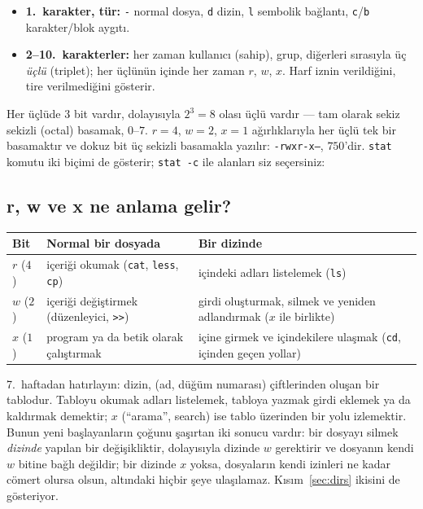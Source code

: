 \documentclass[11pt,a4paper]{article}
\newcommand{\cmd}[1]{\texttt{#1}}
\begin{document}
\begin{itemize}
  \item \textbf{1.\ karakter, tür:} \texttt{-} normal dosya, \texttt{d} dizin, \texttt{l} sembolik bağlantı, \texttt{c}/\texttt{b} karakter/blok aygıtı.
  \item \textbf{2--10.\ karakterler:} her zaman kullanıcı (sahip), grup, diğerleri sırasıyla üç \emph{üçlü} (triplet); her üçlünün içinde her zaman $r$, $w$, $x$. Harf iznin verildiğini, tire verilmediğini gösterir.
\end{itemize}
Her üçlüde $3$ bit vardır, dolayısıyla $2^3 = 8$ olası üçlü vardır --- tam olarak sekiz sekizli (octal) basamak, $0$--$7$. $r = 4$, $w = 2$, $x = 1$ ağırlıklarıyla her üçlü tek bir basamaktır ve dokuz bit üç sekizli basamakla yazılır: \texttt{-rwxr-x---}, $750$'dir. \cmd{stat} komutu iki biçimi de gösterir; \cmd{stat -c} ile alanları siz seçersiniz:



\subsection{r, w ve x ne anlama gelir?}

\begin{center}
\small
\begin{tabularx}{\linewidth}{@{}l X X@{}}
\toprule
\textbf{Bit} & \textbf{Normal bir dosyada} & \textbf{Bir dizinde} \\
\midrule
$r$ ($4$) & içeriği okumak (\cmd{cat}, \cmd{less}, \cmd{cp}) & içindeki adları listelemek (\cmd{ls}) \\
$w$ ($2$) & içeriği değiştirmek (düzenleyici, \texttt{>>}) & girdi oluşturmak, silmek ve yeniden adlandırmak ($x$ ile birlikte) \\
$x$ ($1$) & program ya da betik olarak çalıştırmak & içine girmek ve içindekilere ulaşmak (\cmd{cd}, içinden geçen yollar) \\
\bottomrule
\end{tabularx}
\end{center}

7.~haftadan hatırlayın: dizin, (ad, düğüm numarası) çiftlerinden oluşan bir tablodur. Tabloyu okumak adları listelemek, tabloya yazmak girdi eklemek ya da kaldırmak demektir; $x$ (``arama'', search) ise tablo üzerinden bir yolu izlemektir. Bunun yeni başlayanların çoğunu şaşırtan iki sonucu vardır: bir dosyayı silmek \emph{dizinde} yapılan bir değişikliktir, dolayısıyla dizinde $w$ gerektirir ve dosyanın kendi $w$ bitine bağlı değildir; bir dizinde $x$ yoksa, dosyaların kendi izinleri ne kadar cömert olursa olsun, altındaki hiçbir şeye ulaşılamaz. Kısım~\ref{sec:dirs} ikisini de gösteriyor.
\end{document}
